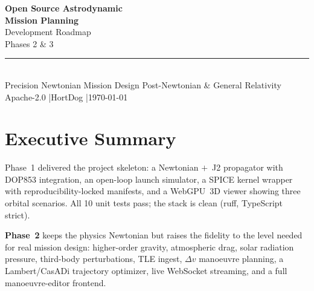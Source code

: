 \documentclass[11pt, a4paper]{article}
\begin{document}
\begin{titlepage}
  \pagecolor{darkbg}
  \color{phosphor}
  \vspace*{3cm}
  \begin{center}
    {\Huge\bfseries Open Source Astrodynamic\\[0.3em]
     Mission Planning}\\[1.5em]
    {\LARGE\color{accentcyan} Development Roadmap}\\[0.8em]
    {\large Phases 2 \& 3}\\[3cm]
    \textcolor{phosphor!60!black}{\rule{0.5\textwidth}{0.4pt}}\\[1em]
    {\normalsize
      Precision Newtonian Mission Design \quad\textbullet\quad
      Post-Newtonian \& General Relativity}\\[2em]
    {\small\color{phosphor!60!black}
      Apache-2.0 \quad|\quad HortDog \quad|\quad \today}
  \end{center}
\end{titlepage}

\pagecolor{white}
\color{black}

\tableofcontents
\newpage

\section{Executive Summary}

Phase~1 delivered the project skeleton: a Newtonian $+$~J2 propagator with
DOP853 integration, an open-loop launch simulator, a SPICE kernel wrapper with
reproducibility-locked manifests, and a WebGPU~3D viewer showing three orbital
scenarios. All 10 unit tests pass; the stack is clean (ruff, TypeScript strict).

\textbf{Phase~2} keeps the physics Newtonian but raises the fidelity to the
level needed for real mission design: higher-order gravity, atmospheric drag,
solar radiation pressure, third-body perturbations, TLE ingest, $\Delta v$
manoeuvre planning, a Lambert/CasADi trajectory optimizer, live WebSocket
streaming, and a full manoeuvre-editor frontend.
\end{document}
